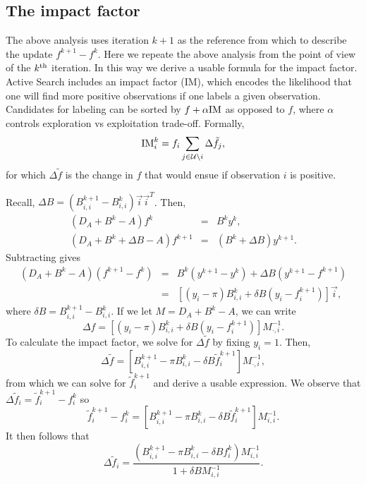 \documentclass[12pt]{article}
\begin{document}
\subsection{The impact factor}
The above analysis uses iteration $k+1$ as the reference from which to describe the update $f^{k+1}-f^k$. Here we repeate the above analysis from the point of view of the $k^{\rm th}$ iteration. In this way we derive a usable formula for the impact factor. Active Search includes an impact factor (IM), which encodes the likelihood that one will find more positive observations if one labels a given observation. Candidates for labeling can be sorted by $f+\alpha {\rm IM}$ as opposed to $f$, where $\alpha$ controls exploration vs exploitation trade-off. Formally,
\begin{equation}
  {\rm IM}^{k}_i = f_i \sum_{j \in \mathcal{U} \setminus i} \Delta \tilde{f}_j,
\end{equation}
for which $\Delta \tilde{f}$ is the change in $f$ that would ensue if observation $i$ is positive.

Recall, $\Delta B = (B^{k+1}_{i,i}-B^k_{i,i})\vec{i}\vec{i}^T$. Then, 
\begin{eqnarray}
(D_A+B^{k}-A)f^k &=& B^{k} y^k, \label{fk} \\
(D_A+B^{k}+\Delta B -A)f^{k+1} &=& (B^{k}+\Delta B)y^{k+1}.
\end{eqnarray}
Subtracting gives
\begin{eqnarray}
  (D_A+B^{k}-A)(f^{k+1}-f^k) &=& B^k(y^{k+1}-y^k)+\Delta B(y^{k+1}-f^{k+1}) \\
                             &=& \left[(y_i-\pi)B^k_{i,i} + \delta B (y_i-f^{k+1}_i)\right] \vec{i},
\end{eqnarray}
where $\delta B= B^{k+1}_{i,i} - B^k_{i,i} $. If we let $M=D_A+B^k-A$, we can write
\begin{equation}
  \Delta f = \left[ (y_i-\pi)B^k_{i,i} + \delta B (y_i-f^{k+1}_i) \right] M^{-1}_{\cdot,i}.
\end{equation}
To calculate the impact factor, we solve for $\Delta \tilde{f}$ by fixing $y_i=1$. Then,
\begin{equation}
  \Delta \tilde{f} = \left[B^{k+1}_{i,i}-\pi B^k_{i,i} - \delta B \tilde{f}^{k+1}_i \right] M^{-1}_{\cdot,i},
\end{equation}
from which we can solve for $\tilde{f}^{k+1}_i$ and derive a usable expression. We observe that $\Delta \tilde{f}_i = \tilde{f}^{k+1}_i - f^k_i$ so
\begin{equation}
  \tilde{f}^{k+1}_i - f^k_i= \left[B^{k+1}_{i,i}-\pi B^k_{i,i} - \delta B \tilde{f}^{k+1}_i \right] M^{-1}_{i,i}.
\end{equation}
It then follows that 
\begin{equation}
  \Delta \tilde{f}_i = \frac{\left(B^{k+1}_{i,i}-\pi B^k_{i,i} -\delta B f^k_i \right) M^{-1}_{i,i}}{1+\delta B M^{-1}_{i,i}}. \label{deltaftilde}
\end{equation}
\end{document}
